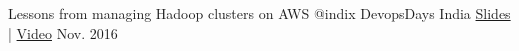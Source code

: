 \begin{cvhonors}

  \cvhonor
    {Lessons from managing Hadoop clusters on AWS @indix} %
    {DevopsDays India} %
    {\href{http://bit.ly/autoscaling-on-aws}{Slides} | \href{https://www.youtube.com/watch?v=eBbgylpRufQ}{Video}} %
    {Nov. 2016} %

\end{cvhonors}
